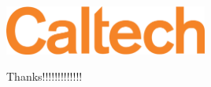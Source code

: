
\begin{frame}\frametitle{}

\vspace*{0.2in}

\begin{center}

\includegraphics[width=0.5\textwidth]{./template/smartAPI-logo-2.pdf}

\vspace*{0.35in}

\vspace*{0.5in}
\begin{minipage}{0.8\textwidth}
Thanks!!!!!!!!!!!!!
\end{minipage}

\end{center}


\end{frame}
